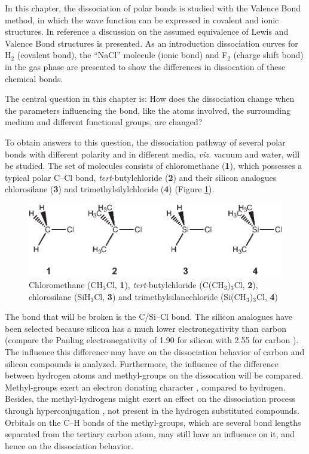 In this chapter, the dissociation of polar bonds is studied with the Valence Bond method, in which the wave function can be expressed in covalent and ionic structures. In reference \cite{interpret} a discussion on the assumed equivalence of Lewis and Valence Bond structures is presented. As an introduction dissociation curves for H$_2$ (covalent bond), the ``NaCl'' molecule (ionic bond) and F$_2$ (charge shift bond) in the gas phase are presented to show the differences in dissocation of these chemical bonds.

The central question in this chapter is: How does the dissociation change when the parameters influencing the bond, like the atoms involved, the surrounding medium and different functional groups, are changed?

To obtain answers to this question, the dissociation pathway of several polar bonds with different polarity and in different media, \textit{viz.} vacuum and water, will be studied.  The set of molecules consists of chloromethane (\textbf{1}), which possesses a typical polar C--Cl bond, \textit{tert}-butylchloride (\textbf{2}) and their silicon analogues chlorosilane (\textbf{3}) and trimethylsilylchloride (\textbf{4}) (Figure \ref{ch3.fig.compounds}).  
\begin{figure}[htbp]
\begin{center}
\includegraphics{dissociation/figures/compounds.eps}
\end{center}
\caption{Chloromethane (CH$_3$Cl, \textbf{1}), \textit{tert}-butylchloride
(C(CH$_3$)$_3$Cl, \textbf{2}), chlorosilane (SiH$_3$Cl, \textbf{3}) and trimethylsilanechloride
(Si(CH$_3$)$_3$Cl, \textbf{4})}
\label{ch3.fig.compounds}
\end{figure} 
The bond that will be broken is the C/Si--Cl bond. The silicon analogues have been selected because silicon has a much lower electronegativity than carbon (compare the Pauling electronegativity of 1.90 for silicon with 2.55 for carbon \cite{handbook}). The influence this difference may have on the dissociation behavior of carbon and silicon compounds is analyzed. Furthermore, the influence of the difference between hydrogen atoms and methyl-groups on the dissocation will be compared. Methyl-groups exert an electron donating character \cite{mcmurry}, compared to hydrogen. Besides, the methyl-hydrogens might exert an effect on the dissociation process through hyperconjugation \cite{march}, not present in the hydrogen substituted compounds. Orbitals on the C--H bonds of the methyl-groups, which are several bond lengths separated from the tertiary carbon atom, may still have an influence on it, and hence on the dissociation behavior. 

